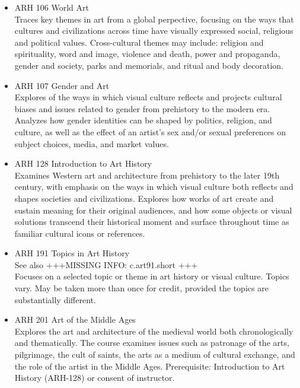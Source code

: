 \documentclass[
  letterpaper,
]{scrbook}
\providecommand{\tightlist}{%
  \setlength{\itemsep}{0pt}\setlength{\parskip}{0pt}}
\begin{document}
\begin{itemize}
\tightlist
\item
  ARH 106 World Art\\
  Traces key themes in art from a global perpective, focusing on the
  ways that cultures and civilizations across time have visually
  expressed social, religious and political values. Cross-cultural
  themes may include: religion and spirituality, word and image,
  violence and death, power and propaganda, gender and society, parks
  and memorials, and ritual and body decoration.\\
\item
  ARH 107 Gender and Art\\
  Explores of the ways in which visual culture reflects and projects
  cultural biases and issues related to gender from prehistory to the
  modern era. Analyzes how gender identities can be shaped by politics,
  religion, and culture, as well as the effect of an artist's sex and/or
  sexual preferences on subject choices, media, and market values.\\
\item
  ARH 128 Introduction to Art History\\
  Examines Western art and architecture from prehistory to the later
  19th century, with emphasis on the ways in which visual culture both
  reflects and shapes societies and civilizations. Explores how works of
  art create and sustain meaning for their original audiences, and how
  some objects or visual solutions transcend their historical moment and
  surface throughout time as familiar cultural icons or references.\\
\item
  ARH 191 Topics in Art History\\
  See also +++MISSING INFO: c.art91.short +++\\
  Focuses on a selected topic or theme in art history or visual culture.
  Topics vary. May be taken more than once for credit, provided the
  topics are substantially different.\\
\item
  ARH 201 Art of the Middle Ages\\
  Explores the art and architecture of the medieval world both
  chronologically and thematically. The course examines issues such as
  patronage of the arts, pilgrimage, the cult of saints, the arts as a
  medium of cultural exchange, and the role of the artist in the Middle
  Ages. Prerequisite: Introduction to Art History (ARH-128) or consent
  of instructor.\\

\end{itemize}
\end{document}
